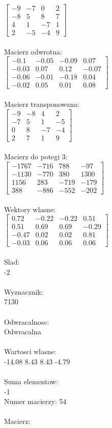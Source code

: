 \documentclass[a4paper,12pt]{article}
\begin{document}
$\begin{bmatrix} -9&-7&0&2\\-8&5&8&7\\4&1&-7&1\\2&-5&-4&9 \end{bmatrix}$
\\
\\
Macierz odwrotna:\\

$\begin{bmatrix} -0.1&-0.05&-0.09&0.07\\-0.03&0.07&0.12&-0.07\\-0.06&-0.01&-0.18&0.04\\-0.02&0.05&0.01&0.08 \end{bmatrix}$
\\
\\
Macierz transponowana:\\

$\begin{bmatrix} -9&-8&4&2\\-7&5&1&-5\\0&8&-7&-4\\2&7&1&9 \end{bmatrix}$
\\
\\
Macierz do potegi 3:\\

$\begin{bmatrix} -1767&-716&788&-97\\-1130&-770&380&1300\\1156&283&-719&-179\\388&-886&-552&-202 \end{bmatrix}$
\\
\\
Wektory wlasne:\\

$\begin{bmatrix} 0.72&-0.22&-0.22&0.51\\0.51&0.69&0.69&-0.29\\-0.47&0.02&0.02&0.81\\-0.03&0.06&0.06&0.06 \end{bmatrix}$
\\
\\
Slad:\\
-2
\\
\\
Wyznacznik:\\
7130
\\
\\
Odwracalnosc:\\
Odwracalna
\\
\\
Wartosci wlasne:\\
-14.08 8.43 8.43 -4.79
\\
\\
Suma elementow:\\
-1
\\
\newpage
Numer macierzy:
54
\\
\\
Macierz:\\
\end{document}
